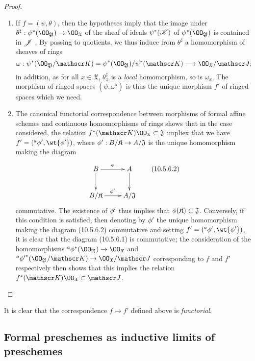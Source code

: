 \begin{proof}
\label{proof-1.10.5.6}
\medskip\noindent
\begin{enumerate}[label=(\roman*)]
  \item If $f=(\psi,\theta)$, then the hypotheses imply that the image under $\theta^\sharp:\psi^*(\OO_\mathfrak{Y})\to\OO_\mathfrak{X}$ of the sheaf of ideals $\psi^*(\mathscr{K})$ of $\psi^*(\OO_\mathfrak{Y})$ is contained in $\mathscr{J}$ .
    By passing to quotients, we thus induce from $\theta^\sharp$ a homomorphism of sheaves of rings
    \[
      \omega:\psi^*(\OO_\mathfrak{Y}/\sh{K})=\psi^*(\OO_\mathfrak{Y})/\psi^*(\sh{K})\to\OO_\mathfrak{X}/\sh{J};
    \]
    in addition, as for all $x\in\mathfrak{X}$, $\theta_x^\sharp$ is a \emph{local} homomorphism, so is $\omega_x$.
    The morphism of ringed spaces $(\psi,\omega^\flat)$ is thus  the unique morphism $f'$ of ringed spaces which we need.
  \item The canonical functorial correspondence between morphisms of formal affine schemes and continuous homomorphisms of rings  shows that in the case considered, the relation $f^*(\sh{K})\OO_\mathfrak{X}\subset\mathfrak{J}$ impliex that we have $f'=({}^a\vphi',\wt{\vphi'})$, where $\vphi':B/\mathfrak{K}\to A/\mathfrak{J}$ is the unique homomorphism making the diagram
    \[
      \xymatrix{
        B\ar[r]^\vphi\ar[d] &
        A\ar[d]\\
        B/\mathfrak{K}\ar[r]^{\vphi'} &
        A/\mathfrak{J}
      }
      \tag{10.5.6.2}
    \]
    commutative.
    The existence of $\phi'$ thus implies that $\phi(\mathfrak{K})\subset\mathfrak{J}$.
    Conversely, if this condition is satisfied, then denoting by $\phi'$ the unique homomorphism making the diagram (10.5.6.2) commutative and setting $f'=({}^a\vphi',\wt{\vphi'})$, it is clear that the diagram (10.5.6.1) is commutative; the consideration of the homomorphisms ${}^a\vphi^*(\OO_\mathfrak{Y})\to\OO_\mathfrak{X}$ and ${}^a{\vphi'}^*(\OO_\mathfrak{Y}/\sh{K})\to\OO_\mathfrak{X}/\sh{J}$ corresponding to $f$ and $f'$ respectively then shows that this implies the relation $f^*(\sh{K})\OO_\mathfrak{X}\subset\sh{J}$.
\end{enumerate}
\end{proof}

It is clear that the correspondence $f\mapsto f'$ defined above is \emph{functorial}.

\subsection{Formal preschemes as inductive limits of preschemes}
\label{subsection:1.10.6}


